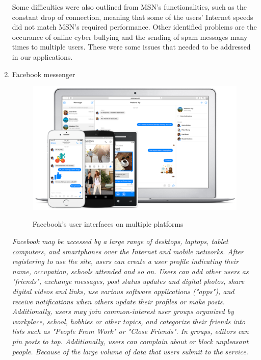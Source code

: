 \documentclass{article}
\begin{document}
\begin{enumerate}
	Some difficulties were also outlined from MSN's functionalities, such as the constant drop of connection, meaning that some of the users' Internet speeds did not match MSN's required performance. Other identified problems are the occurance of online cyber bullying and the sending of spam messages many times to multiple users. These were some issues that needed to be addressed in our applications.\par 
	
		\item Facebook messenger
	
	\begin{figure}[h]
		\centering
		\includegraphics[scale=0.3]{facebookUI.png}
		\cite{facebookmessenger}
		\caption{Facebook's user interfaces on multiple platforms}
	\end{figure}

		\textit{Facebook may be accessed by a large range of desktops, laptops, tablet computers, and smartphones over the Internet and mobile networks. After registering to use the site, users can create a user profile indicating their name, occupation, schools attended and so on. Users can add other users as "friends", exchange messages, post status updates and digital photos, share digital videos and links, use various software applications ("apps"), and receive notifications when others update their profiles or make posts. Additionally, users may join common-interest user groups organized by workplace, school, hobbies or other topics, and categorize their friends into lists such as "People From Work" or "Close Friends". In groups, editors can pin posts to top. Additionally, users can complain about or block unpleasant people. Because of the large volume of data that users submit to the service.}\par \cite{facebookdesc}
	

\end{enumerate}
\end{document}
